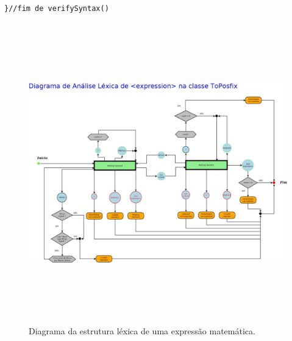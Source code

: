 \documentclass[a4paper,12pt,openany]{book}
\begin{document}
\begin{lstlisting}
}//fim de verifySyntax()
\end{lstlisting}

\begin{figure}[!b]
	\centering
	\includegraphics[height=13cm,width=20cm]{figuras/Diagrama1.jpeg}
	\caption{Diagrama da estrutura léxica de uma expressão matemática.}
	\label{figura:diagrama} 
\end{figure}

\newpage




\appendix




\end{document}
